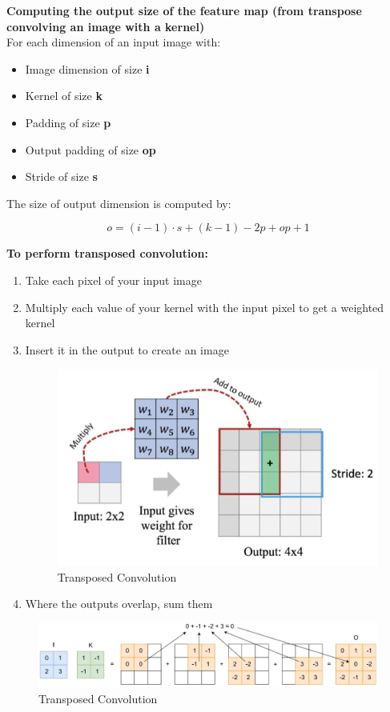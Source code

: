 \begin{theorem}
    \textbf{Computing the output size of the feature map (from transpose convolving an image with a kernel)}\\

For each dimension of an input image with:
\begin{itemize}
    \item Image dimension of size \textbf{i}
    \item Kernel of size \textbf{k}
    \item Padding of size \textbf{p}
    \item Output padding of size \textbf{op}
    \item Stride of size \textbf{s}
\end{itemize}
The size of output dimension is computed by:


\[o = (i - 1) \cdot s + (k - 1) - 2p + op + 1 \]

\end{theorem}

\textbf{To perform transposed convolution:}
\begin{enumerate}
    \item Take each pixel of your input image
    \item Multiply each value of your kernel with the input pixel to get a weighted kernel
    \item Insert it in the output to create an image
\begin{figure}[h!t]
    \centering
    \includegraphics[width=0.45\linewidth]{tconv1.png}
    \caption{Transposed Convolution}
    \label{fig:enter-label}
\end{figure}
    \item Where the outputs overlap, sum them
\end{enumerate}
\begin{figure}[h!t]
    \centering
    \includegraphics[width=0.75\linewidth]{tconv2.png}
    \caption{Transposed Convolution}
    \label{fig:enter-label}
\end{figure}


